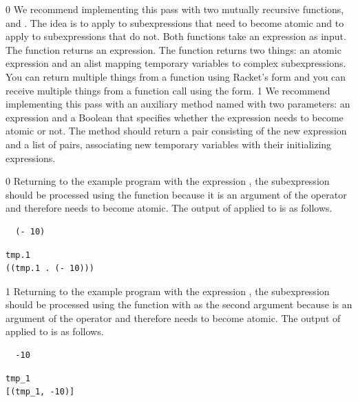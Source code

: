 \documentclass[7x10,nocrop]{TimesAPriori_MIT}%
\def\racketEd{0}
\def\pythonEd{1}
\def\edition{0}
\begin{document}
{\if\edition\racketEd
We recommend implementing this pass with two mutually recursive
functions,  and . The idea is to apply
 to subexpressions that need to become atomic and to
apply  to subexpressions that do not.  Both functions
take an \LangVar{} expression as input.  The  function
returns an expression.  The  function returns two
things: an atomic expression and an alist mapping temporary variables to
complex subexpressions. You can return multiple things from a function
using Racket's  form and you can receive multiple things
from a function call using the  form.
\fi}
%
{\if\edition\pythonEd
%
We recommend implementing this pass with an auxiliary method named
 with two parameters: an \LangVar{} expression and a
Boolean that specifies whether the expression needs to become atomic
or not.  The  method should return a pair consisting of
the new expression and a list of pairs, associating new temporary
variables with their initializing expressions.
%
\fi}

{\if\edition\racketEd
%
Returning to the example program with the expression , the subexpression  should be processed using the
 function because it is an argument of the \code{+}
operator and therefore needs to become atomic.  The output of
 applied to  is as follows.
\begin{transformation}
\begin{lstlisting}
  (- 10)
\end{lstlisting}
\compilesto
\begin{lstlisting}
tmp.1
((tmp.1 . (- 10)))
\end{lstlisting}
\end{transformation}
\fi}
%
{\if\edition\pythonEd
%
Returning to the example program with the expression ,
the subexpression  should be processed using the
 function with  as the second argument
because  is an argument of the \code{+} operator and
therefore needs to become atomic.  The output of 
applied to  is as follows.
\begin{transformation}
\begin{lstlisting}
  -10
\end{lstlisting}
\compilesto
\begin{lstlisting}
tmp_1
[(tmp_1, -10)]
\end{lstlisting}
\end{transformation}
%  
\fi}
\end{document}
